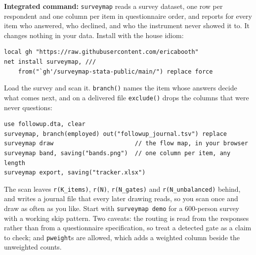 \documentclass[
    a4paper,
    fontsize=10pt,
    twoside=true,
    numbers=noenddot,
]{kaobook}
\begin{document}
\begin{kaobox}[frametitle=Package Integration: \texttt{surveymap}]
\textbf{Integrated command:} \texttt{surveymap} reads a survey dataset, one row per respondent and one column per item in questionnaire order, and reports for every item who answered, who declined, and who the instrument never showed it to. It changes nothing in your data. Install with the house idiom:
\par
{\footnotesize
\begin{verbatim}
local gh "https://raw.githubusercontent.com/ericabooth"
net install surveymap, ///
    from("`gh'/surveymap-stata-public/main/") replace force
\end{verbatim}
}
Load the survey and scan it. \texttt{branch()} names the item whose answers decide what comes next, and on a delivered file \texttt{exclude()} drops the columns that were never questions:
\par
{\footnotesize
\begin{verbatim}
use followup.dta, clear
surveymap, branch(employed) out("followup_journal.tsv") replace
surveymap draw                       // the flow map, in your browser
surveymap band, saving("bands.png")  // one column per item, any length
surveymap export, saving("tracker.xlsx")
\end{verbatim}
}
The scan leaves \texttt{r(K\_items)}, \texttt{r(N)}, \texttt{r(N\_gates)} and \texttt{r(N\_unbalanced)} behind, and writes a journal file that every later drawing reads, so you scan once and draw as often as you like. Start with \texttt{surveymap demo} for a 600-person survey with a working skip pattern. Two caveats: the routing is read from the responses rather than from a questionnaire specification, so treat a detected gate as a claim to check; and \texttt{pweight}s are allowed, which adds a weighted column beside the unweighted counts.
\end{kaobox}
\end{document}
